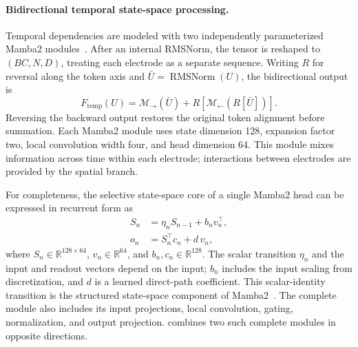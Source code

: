 \documentclass{article}
\DeclareMathOperator{\RN}{RMSNorm}
\begin{document}
\paragraph{Bidirectional temporal state-space processing.}
Temporal dependencies are modeled with two independently parameterized
Mamba2 modules~\cite{dao2024mamba2}. After an internal RMSNorm, the tensor
is reshaped to $(BC,N,D)$, treating each electrode as a separate sequence.
Writing $R$ for reversal along the token axis and $\bar U=\RN(U)$, the
bidirectional output is
\begin{equation}
    F_{\mathrm{temp}}(U)
      =\mathcal{M}_{\rightarrow}(\bar U)
       +R\!\left[\mathcal{M}_{\leftarrow}(R[\bar U])\right].
    \label{eq:bimamba}
\end{equation}
Reversing the backward output restores the original token alignment before
summation. Each Mamba2 module uses state dimension 128, expansion factor two,
local convolution width four, and head dimension 64. This module mixes
information across time within each electrode; interactions between
electrodes are provided by the spatial branch.

For completeness, the selective state-space core of a single Mamba2 head
can be expressed in recurrent form as
\begin{align}
    S_n&=\eta_n S_{n-1}+b_n v_n^\top,\\
    o_n&=S_n^\top c_n+d\,v_n,
    \label{eq:mamba-state}
\end{align}
where $S_n\in\mathbb{R}^{128\times64}$, $v_n\in\mathbb{R}^{64}$,
and $b_n,c_n\in\mathbb{R}^{128}$. The scalar transition $\eta_n$ and the
input and readout vectors depend on the input; $b_n$ includes the input
scaling from discretization, and $d$ is a learned direct-path coefficient.
This scalar-identity transition is the structured state-space component of
Mamba2~\cite{dao2024mamba2}. The complete module also includes its input
projections, local convolution, gating, normalization, and output projection.
 combines two such complete modules in opposite directions.
\end{document}
